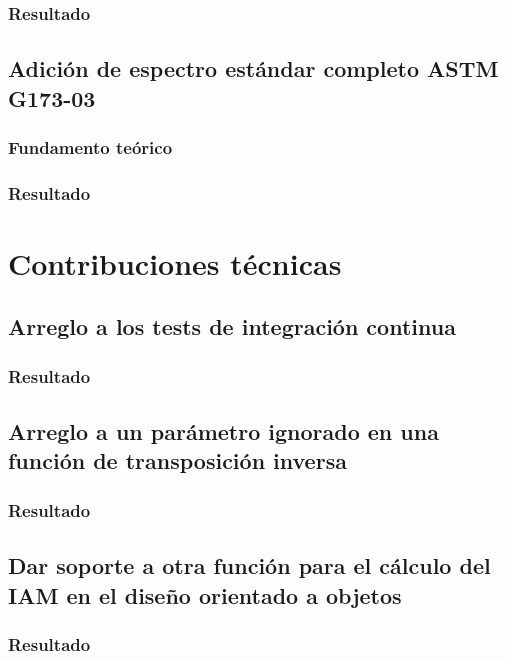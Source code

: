 \subsubsection{Resultado}

\subsection{Adición de espectro estándar completo ASTM G173-03}

\subsubsection{Fundamento teórico}

\subsubsection{Resultado}

\section{Contribuciones técnicas} \label{sct:desarrollo:contribuciones_tecnicas}

\subsection{Arreglo a los tests de integración continua}

\subsubsection{Resultado}

\subsection{Arreglo a un parámetro ignorado en una función de transposición inversa}

\subsubsection{Resultado}

\subsection{Dar soporte a otra función para el cálculo del IAM en el diseño orientado a objetos}

\subsubsection{Resultado}

